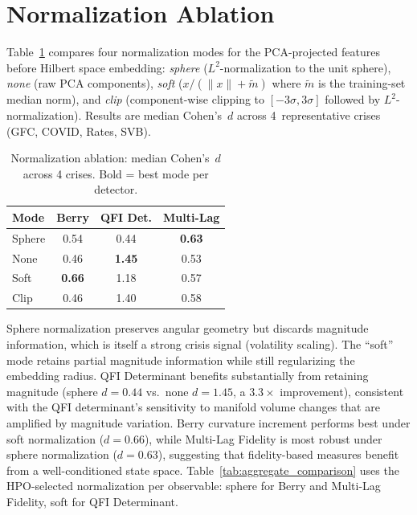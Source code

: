 \documentclass[3p]{elsarticle}
\begin{document}
\section{Normalization Ablation}\label{sec:normalization_ablation}

Table~\ref{tab:normalization} compares four normalization modes for the
PCA-projected features before Hilbert space embedding: \emph{sphere}
($L^2$-normalization to the unit sphere), \emph{none} (raw PCA
components), \emph{soft} ($x / (\|x\| + \tilde{m})$ where $\tilde{m}$
is the training-set median norm), and \emph{clip} (component-wise
clipping to $[-3\sigma, 3\sigma]$ followed by $L^2$-normalization).
Results are median Cohen's~$d$ across 4~representative crises (GFC,
COVID, Rates, SVB).

\begin{table}[htb]
\centering
\caption{Normalization ablation: median Cohen's~$d$ across 4 crises.
  Bold = best mode per detector.}
\label{tab:normalization}
\small
\begin{tabular}{lccc}
\toprule
Mode & Berry & QFI Det. & Multi-Lag \\
\midrule
Sphere & 0.54 & 0.44 & \textbf{0.63} \\
None   & 0.46 & \textbf{1.45} & 0.53 \\
Soft   & \textbf{0.66} & 1.18 & 0.57 \\
Clip   & 0.46 & 1.40 & 0.58 \\
\bottomrule
\end{tabular}
\end{table}

Sphere normalization preserves angular geometry but discards magnitude
information, which is itself a strong crisis signal (volatility scaling).
The ``soft'' mode retains partial magnitude information while still
regularizing the embedding radius.  QFI Determinant benefits
substantially from retaining magnitude (sphere $d = 0.44$ vs.\ none
$d = 1.45$, a $3.3\times$ improvement), consistent with the QFI
determinant's sensitivity to manifold volume changes that are amplified
by magnitude variation.  Berry curvature increment performs best under
soft normalization ($d = 0.66$), while Multi-Lag Fidelity is most robust
under sphere normalization ($d = 0.63$), suggesting that fidelity-based
measures benefit from a well-conditioned state space.
Table~\ref{tab:aggregate_comparison} uses the HPO-selected normalization per
observable: sphere for Berry and Multi-Lag Fidelity, soft for QFI
Determinant.
\end{document}
